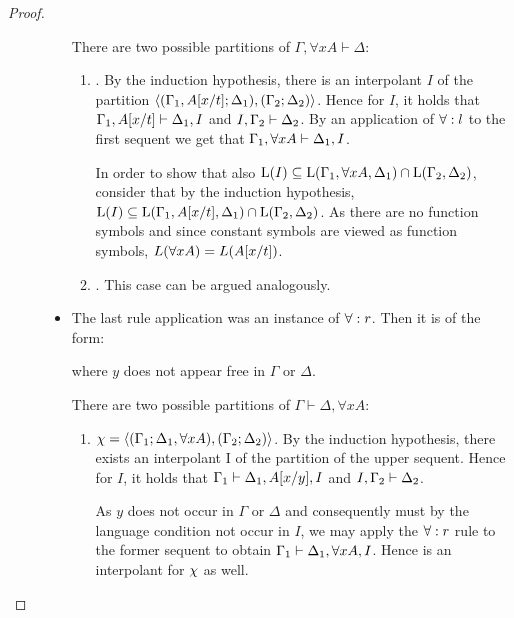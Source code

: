 \begin{proof}
\begin{description}
\begin{itemize}
					There are two possible partitions of $\Gamma, \forall x A \vdash \Delta$:
					\begin{enumerate}
						\item {}.
							By the induction hypothesis, there is an interpolant $I$ of the partition $ \langle (\Gamma_1, A[x/t]; \Delta_1), (\Gamma_2; \Delta_2)\rangle $.
							Hence for $I$, it holds that
							$\Gamma_1, A[x/t] \vdash \Delta_1, I$ and  
							$I, \Gamma_2 \vdash \Delta_2$.
							By an application of $\forall:l$ to the first sequent we get that $\Gamma_1, \forall x A\vdash \Delta_1, I$.

							In order to show that also $\operatorname{L}(I) \subseteq \operatorname{L}(\Gamma_1, \forall x A, \Delta_1) \cap \operatorname{L}(\Gamma_2, \Delta_2)$, consider that by the induction hypothesis, 
							$\operatorname{L}(I) \subseteq \operatorname{L}(\Gamma_1, A[x/t], \Delta_1) \cap \operatorname{L}(\Gamma_2, \Delta_2)$.
							As there are no function symbols and since constant symbols are viewed as function symbols, $L(\forall x A) = L(A[x/t])$.


						\item {}.
							This case can be argued analogously.
					\end{enumerate}

				\item The last rule application was an instance of $\forall:r$. Then it is of the form:

					\begin{prooftree}
					\end{prooftree}
					where $y$ does not appear free in $\Gamma$ or $\Delta$.

					There are two possible partitions of $\Gamma\vdash \Delta, \forall x A $:
					\begin{enumerate}
						\item $\chi =  \langle (\Gamma_1; \Delta_1, \forall x A), (\Gamma_2; \Delta_2)\rangle $.
							By the induction hypothesis, there exists an interpolant I of the partition 
							 of the upper sequent.
							Hence for $I$, it holds that
							$\Gamma_1 \vdash \Delta_1, A[x/y], I$ and
							$I, \Gamma_2 \vdash \Delta_2$.

							As $y$ does not occur in $\Gamma$ or $\Delta$ and consequently must by the language condition not occur in $I$, we may apply the $\forall:r$ rule to the former sequent to obtain $\Gamma_1 \vdash \Delta_1, \forall x A, I$.
							Hence is an interpolant for $\chi$ as well.


\end{enumerate}
\end{itemize}
\end{description}
\end{proof}
